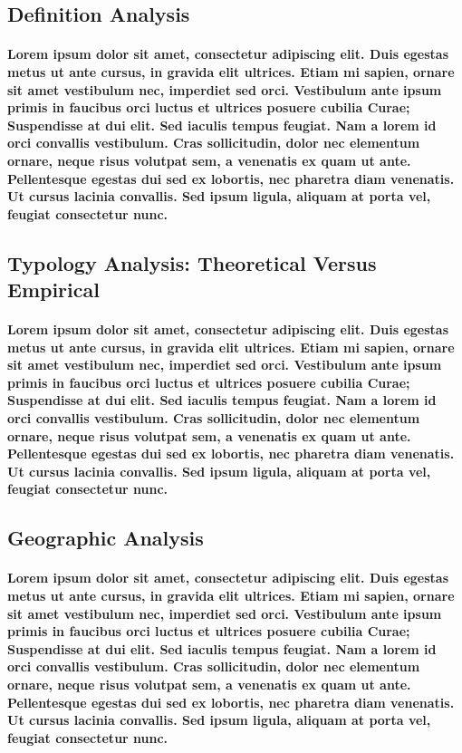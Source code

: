 \documentclass[11pt, twocolumn]{article}
\begin{document}
\subsection{Definition Analysis}
\paragraph{Lorem ipsum dolor sit amet, consectetur adipiscing elit. Duis egestas metus ut ante cursus, in gravida elit ultrices. Etiam mi sapien, ornare sit amet vestibulum nec, imperdiet sed orci. Vestibulum ante ipsum primis in faucibus orci luctus et ultrices posuere cubilia Curae; Suspendisse at dui elit. Sed iaculis tempus feugiat. Nam a lorem id orci convallis vestibulum. Cras sollicitudin, dolor nec elementum ornare, neque risus volutpat sem, a venenatis ex quam ut ante. Pellentesque egestas dui sed ex lobortis, nec pharetra diam venenatis. Ut cursus lacinia convallis. Sed ipsum ligula, aliquam at porta vel, feugiat consectetur nunc.}

\subsection{Typology Analysis: Theoretical Versus Empirical}
\paragraph{Lorem ipsum dolor sit amet, consectetur adipiscing elit. Duis egestas metus ut ante cursus, in gravida elit ultrices. Etiam mi sapien, ornare sit amet vestibulum nec, imperdiet sed orci. Vestibulum ante ipsum primis in faucibus orci luctus et ultrices posuere cubilia Curae; Suspendisse at dui elit. Sed iaculis tempus feugiat. Nam a lorem id orci convallis vestibulum. Cras sollicitudin, dolor nec elementum ornare, neque risus volutpat sem, a venenatis ex quam ut ante. Pellentesque egestas dui sed ex lobortis, nec pharetra diam venenatis. Ut cursus lacinia convallis. Sed ipsum ligula, aliquam at porta vel, feugiat consectetur nunc.}

\subsection{Geographic Analysis}
\paragraph{Lorem ipsum dolor sit amet, consectetur adipiscing elit. Duis egestas metus ut ante cursus, in gravida elit ultrices. Etiam mi sapien, ornare sit amet vestibulum nec, imperdiet sed orci. Vestibulum ante ipsum primis in faucibus orci luctus et ultrices posuere cubilia Curae; Suspendisse at dui elit. Sed iaculis tempus feugiat. Nam a lorem id orci convallis vestibulum. Cras sollicitudin, dolor nec elementum ornare, neque risus volutpat sem, a venenatis ex quam ut ante. Pellentesque egestas dui sed ex lobortis, nec pharetra diam venenatis. Ut cursus lacinia convallis. Sed ipsum ligula, aliquam at porta vel, feugiat consectetur nunc.}
\end{document}

